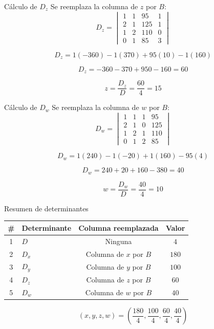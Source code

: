 \documentclass[aspectratio=169]{beamer}
\newcommand{\detm}[1]{\begin{vmatrix}#1\end{vmatrix}}
\begin{document}
\begin{frame}[shrink=8]{Cálculo de $D_z$}
Se reemplaza la columna de $z$ por $B$:
\[
D_z=\detm{
1&1&95&1\\
2&1&125&1\\
1&2&110&0\\
0&1&85&3}
\]

\[
D_z=1(-360)-1(370)+95(10)-1(160)
\]

\[
D_z=-360-370+950-160=\boxed{60}
\]

\[
z=\frac{D_z}{D}=\frac{60}{4}=\boxed{15}
\]
\end{frame}

\begin{frame}[shrink=8]{Cálculo de $D_w$}
Se reemplaza la columna de $w$ por $B$:
\[
D_w=\detm{
1&1&1&95\\
2&1&0&125\\
1&2&1&110\\
0&1&2&85}
\]

\[
D_w=1(240)-1(-20)+1(160)-95(4)
\]

\[
D_w=240+20+160-380=\boxed{40}
\]

\[
w=\frac{D_w}{D}=\frac{40}{4}=\boxed{10}
\]
\end{frame}

\begin{frame}{Resumen de determinantes}
\begin{table}
\centering
\begin{tabular}{clcc}
\toprule
\# & Determinante & Columna reemplazada & Valor \\
\midrule
1 & $D$ & Ninguna & $4$ \\
2 & $D_x$ & Columna de $x$ por $B$ & $180$ \\
3 & $D_y$ & Columna de $y$ por $B$ & $100$ \\
4 & $D_z$ & Columna de $z$ por $B$ & $60$ \\
5 & $D_w$ & Columna de $w$ por $B$ & $40$ \\
\bottomrule
\end{tabular}
\end{table}

\[
(x,y,z,w)=\left(\frac{180}{4},\frac{100}{4},\frac{60}{4},\frac{40}{4}\right)
\]
\end{frame}
\end{document}
